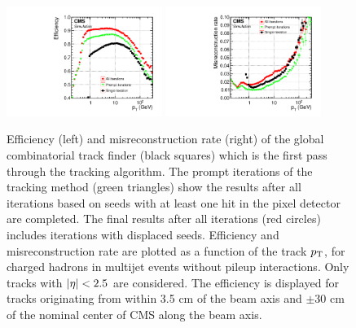\begin{figure}[htbp]
\centering
     \includegraphics[width=0.45\textwidth]{object_reconstruction_and_selection/plots/pf_track_eff.pdf}
     \includegraphics[width=0.45\textwidth]{object_reconstruction_and_selection/plots/pf_track_misId.pdf}
     \caption{
Efficiency (left) and misreconstruction rate (right) of the global combinatorial track finder (black squares) 
which is the first pass through the tracking algorithm. The prompt iterations of the tracking method (green 
triangles) show the results after all iterations based on seeds with at least one 
hit in the pixel detector are completed. The final results after all iterations (red circles) includes
iterations with displaced seeds. Efficiency and misreconstruction rate are plotted as a function 
of the track $p_\mathrm{T}$, for charged hadrons in multijet events without pileup interactions. Only tracks with 
$\lvert\eta\rvert < 2.5$ are considered. The efficiency 
is displayed for tracks originating from within 3.5 cm of the beam axis and $\pm$30 cm of the nominal 
center of CMS along the beam axis.
     }
     \label{fig:kf_tracking}
\end{figure}

